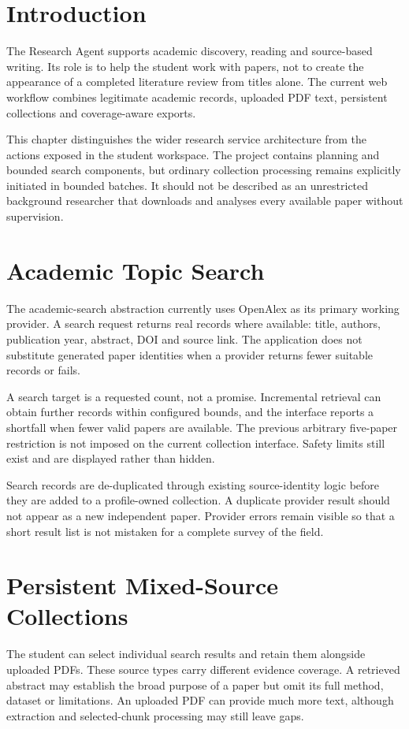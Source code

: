 \section{Introduction}
The Research Agent supports academic discovery, reading and source-based writing. Its role is to help the student work with papers, not to create the appearance of a completed literature review from titles alone. The current web workflow combines legitimate academic records, uploaded PDF text, persistent collections and coverage-aware exports.

This chapter distinguishes the wider research service architecture from the actions exposed in the student workspace. The project contains planning and bounded search components, but ordinary collection processing remains explicitly initiated in bounded batches. It should not be described as an unrestricted background researcher that downloads and analyses every available paper without supervision.

\section{Academic Topic Search}
The academic-search abstraction currently uses OpenAlex as its primary working provider. A search request returns real records where available: title, authors, publication year, abstract, DOI and source link. The application does not substitute generated paper identities when a provider returns fewer suitable records or fails.

A search target is a requested count, not a promise. Incremental retrieval can obtain further records within configured bounds, and the interface reports a shortfall when fewer valid papers are available. The previous arbitrary five-paper restriction is not imposed on the current collection interface. Safety limits still exist and are displayed rather than hidden.

Search records are de-duplicated through existing source-identity logic before they are added to a profile-owned collection. A duplicate provider result should not appear as a new independent paper. Provider errors remain visible so that a short result list is not mistaken for a complete survey of the field.

\section{Persistent Mixed-Source Collections}
The student can select individual search results and retain them alongside uploaded PDFs. These source types carry different evidence coverage. A retrieved abstract may establish the broad purpose of a paper but omit its full method, dataset or limitations. An uploaded PDF can provide much more text, although extraction and selected-chunk processing may still leave gaps.

